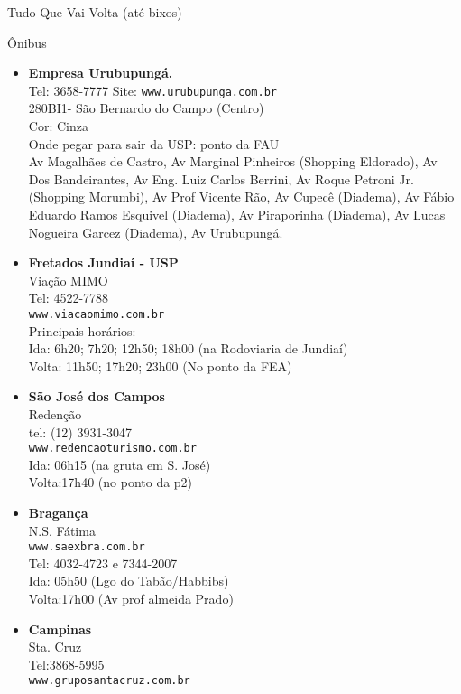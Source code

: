 \begin{secao}{Tudo Que Vai Volta (até bixos)}
\begin{subsecao}{Ônibus}
\begin{itemize}
  \item {\bf Empresa Urubupungá.}\\
    Tel: 3658-7777
    Site: {\tt www.urubupunga.com.br}\\
    280BI1- São Bernardo do Campo (Centro)\\
    Cor: Cinza\\
    Onde pegar para sair da USP: ponto da FAU\\
    Av Magalhães de Castro, Av Marginal Pinheiros (Shopping Eldorado), Av Dos
    Bandeirantes, Av Eng. Luiz Carlos Berrini, Av Roque Petroni Jr. (Shopping
    Morumbi), Av Prof Vicente Rão, Av Cupecê (Diadema), Av Fábio Eduardo Ramos
    Esquivel (Diadema), Av Piraporinha (Diadema), Av Lucas Nogueira Garcez
    (Diadema), Av Urubupungá.

  \item {\bf Fretados Jundiaí - USP}\\
    Viação MIMO\\
    Tel: 4522-7788\\
    {\tt www.viacaomimo.com.br}\\
    Principais horários:\\
    Ida: 6h20; 7h20; 12h50; 18h00 (na Rodoviaria de Jundiaí)\\
    Volta: 11h50; 17h20; 23h00 (No ponto da FEA)

  \item {\bf São José dos Campos}\\
    Redenção\\
    tel: (12) 3931-3047\\
    {\tt www.redencaoturismo.com.br}\\
    Ida: 06h15 (na gruta em S. José)\\
    Volta:17h40 (no ponto da p2)

  \item {\bf Bragança}\\
    N.S. Fátima\\
    {\tt www.saexbra.com.br}\\
    Tel: 4032-4723 e 7344-2007\\
    Ida: 05h50 (Lgo do Tabão/Habbibs)\\
    Volta:17h00 (Av prof almeida Prado)

  \item {\bf Campinas}\\
    Sta. Cruz\\
    Tel:3868-5995\\
    {\tt www.gruposantacruz.com.br}


\end{itemize}
\end{subsecao}
\end{secao}
